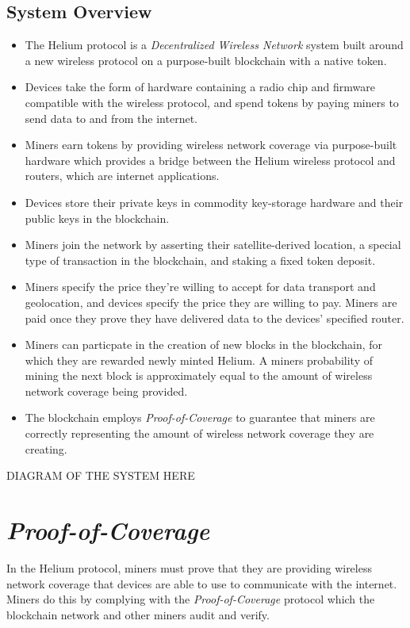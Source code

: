 \documentclass[letterpaper,11pt]{article}
\def\proofofcoverage/{\textit{Proof-of-Coverage}}
\begin{document}
\subsection{System Overview}

\begin{itemize}
	\item The Helium protocol is a \textit{Decentralized Wireless Network} system built around a new wireless protocol on a purpose-built blockchain with a native token.
	\item Devices take the form of hardware containing a radio chip and firmware compatible with the wireless protocol, and spend tokens by paying miners to send data to and from the internet.
	\item Miners earn tokens by providing wireless network coverage via purpose-built hardware which provides a bridge between the Helium wireless protocol and routers, which are internet applications.
	\item Devices store their private keys in commodity key-storage hardware and their public keys in the blockchain.
	\item Miners join the network by asserting their satellite-derived location, a special type of transaction in the blockchain, and staking a fixed token deposit.
	\item Miners specify the price they're willing to accept for data transport and geolocation, and devices specify the price they are willing to pay. Miners are paid once they prove they have delivered data to the devices' specified router.
	\item Miners can particpate in the creation of new blocks in the blockchain, for which they are rewarded newly minted Helium. A miners probability of mining the next block is approximately equal to the amount of wireless network coverage being provided.
	\item The blockchain employs \proofofcoverage/ to guarantee that miners are correctly representing the amount of wireless network coverage they are creating.
\end{itemize}

DIAGRAM OF THE SYSTEM HERE

\section{\proofofcoverage/} \label{poc}

In the Helium protocol, miners must prove that they are providing wireless network coverage that devices are able to use to communicate with the internet. Miners do this by complying with the \textit{Proof-of-Coverage} protocol which the blockchain network and other miners audit and verify.\newline
\end{document}
